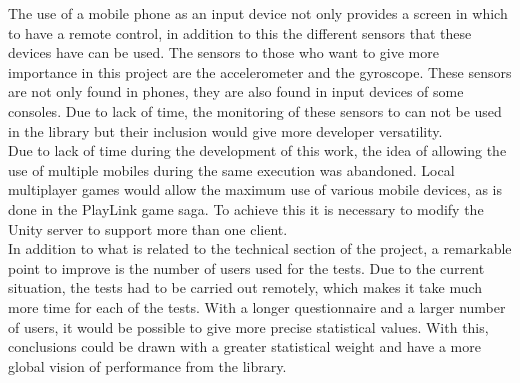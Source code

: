 The use of a mobile phone as an input device not only provides a screen in which to have a remote control, in addition to this the different sensors that these devices have can be used. The sensors to those who want to give more importance in this project are the accelerometer and the gyroscope. These sensors are not only found in phones, they are also found in input devices of some consoles. Due to lack of time, the monitoring of these sensors to can not be used in the library but their inclusion would give more developer versatility.\\

Due to lack of time during the development of this work, the idea of allowing the use of multiple mobiles during the same execution was abandoned. Local multiplayer games would allow the maximum use of various mobile devices, as is done in the PlayLink game saga. To achieve this it is necessary to modify the Unity server to support more than one client.\\

In addition to what is related to the technical section of the project, a remarkable point to improve is the number of users used for the tests. Due to the current situation, the tests had to be carried out remotely, which makes it take much more time for each of the tests. With a longer questionnaire and a larger number of users, it would be possible to give more precise statistical values. With this, conclusions could be drawn with a greater statistical weight and have a more global vision of performance from the library.\\
